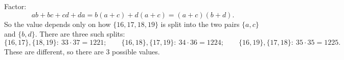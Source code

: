 Factor:
\[ab+bc+cd+da=b(a+c)+d(a+c)=(a+c)(b+d).\]
So the value depends only on how $\{16,17,18,19\}$ is split into the two pairs $\{a,c\}$ and $\{b,d\}$. There are three such splits:
\[\{16,17\},\{18,19\}:\ 33\cdot37=1221;\qquad\{16,18\},\{17,19\}:\ 34\cdot36=1224;\qquad\{16,19\},\{17,18\}:\ 35\cdot35=1225.\]
These are different, so there are $\boxed{3}$ possible values.
